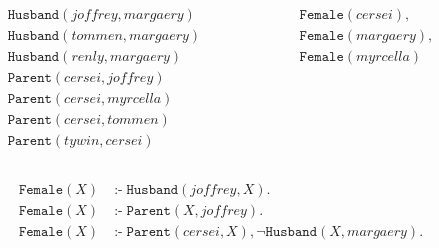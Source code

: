 \documentclass{beamer}
\DeclareMathOperator{\ifff}{:-}
\begin{document}
\begin{frame}
  \begin{columns}
    \begin{column}{0.5\textwidth}
      \begin{alertblock}{}
        \vspace*{-1.5\baselineskip}\setlength\belowdisplayshortskip{0pt}
        \begin{gather*}
          \mathtt{Husband}(\mathit{joffrey}, \mathit{margaery}) \\
          \mathtt{Husband}(\mathit{tommen}, \mathit{margaery}) \\
          \mathtt{Husband}(\mathit{renly}, \mathit{margaery}) \\
          \mathtt{Parent}(\mathit{cersei}, \mathit{joffrey}) \\
          \mathtt{Parent}(\mathit{cersei}, \mathit{myrcella}) \\
          \mathtt{Parent}(\mathit{cersei}, \mathit{tommen}) \\
          \mathtt{Parent}(\mathit{tywin}, \mathit{cersei})
        \end{gather*}
        \vspace*{-1.5\baselineskip}\setlength\belowdisplayshortskip{0pt}
      \end{alertblock}
    \end{column}
    \begin{column}{0.5\textwidth}
      \begin{exampleblock}{}
        \vspace*{-1.5\baselineskip}\setlength\belowdisplayshortskip{0pt}
        \begin{gather*}
          \mathtt{Female}(\mathit{cersei}), \\
          \mathtt{Female}(\mathit{margaery}), \\
          \mathtt{Female}(\mathit{myrcella})
        \end{gather*}
        \vspace*{-1.5\baselineskip}\setlength\belowdisplayshortskip{0pt}
      \end{exampleblock}
    \end{column}
  \end{columns}
  \begin{block}{}
    \vspace*{-1.5\baselineskip}\setlength\belowdisplayshortskip{0pt}
    \begin{align*}
      \mathtt{Female}(X) &\ifff \mathtt{Husband}(\mathit{joffrey}, X). \\
      \mathtt{Female}(X) &\ifff \mathtt{Parent}(X, \mathit{joffrey}). \\
      \mathtt{Female}(X) &\ifff \mathtt{Parent}(\mathit{cersei}, X), \neg\mathtt{Husband}(X, \mathit{margaery}).
    \end{align*}
    \vspace*{-1.5\baselineskip}\setlength\belowdisplayshortskip{0pt}
  \end{block}
\end{frame}
\end{document}
